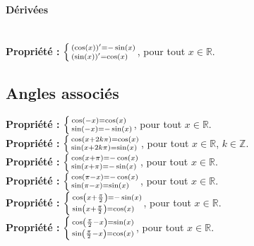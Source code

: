 \documentclass[a4paper,titlepage]{article}
\let\oldleft\left
\renewcommand{\left}{\mathopen{}\mathclose\bgroup\oldleft}
\let\oldright\right
\renewcommand{\right}{\aftergroup\egroup\oldright}
\begin{document}
            \paragraph{Dérivées}\mbox{}\\
                \textbf{Propriété :} $\left\{\begin{smallmatrix*}[l]\left(\cos\left(x\right)\right)^{\prime}=-\sin\left(x\right)\\\left(\sin\left(x\right)\right)^{\prime}=\cos\left(x\right)\end{smallmatrix*}\!\right.$, pour tout $x\in\mathbb{R}$.
    \subsection{Angles associés}
        \textbf{Propriété :} $\left\{\begin{smallmatrix*}[l]\cos\left(-x\right)=\cos\left(x\right)\\\sin\left(-x\right)=-\sin\left(x\right)\end{smallmatrix*}\!\right.$, pour tout $x\in\mathbb{R}$.
        \\
        \textbf{Propriété :} $\left\{\begin{smallmatrix*}[l]\cos\left(x+2k\pi\right)=\cos\left(x\right)\\\sin\left(x+2k\pi\right)=\sin\left(x\right)\end{smallmatrix*}\!\right.$, pour tout $x\in\mathbb{R}$, $k\in\mathbb{Z}$.
        \\
        \textbf{Propriété :} $\left\{\begin{smallmatrix*}[l]\cos\left(x+\pi\right)=-\cos\left(x\right)\\\sin\left(x+\pi\right)=-\sin\left(x\right)\end{smallmatrix*}\!\right.$, pour tout $x\in\mathbb{R}$.
        \\
        \textbf{Propriété :} $\left\{\begin{smallmatrix*}[l]\cos\left(\pi-x\right)=-\cos\left(x\right)\\\sin\left(\pi-x\right)=\sin\left(x\right)\end{smallmatrix*}\!\right.$, pour tout $x\in\mathbb{R}$.
        \\
        \textbf{Propriété :} $\left\{\begin{smallmatrix*}[l]\cos\left(x+\frac{\pi}{2}\right)=-\sin\left(x\right)\\\sin\left(x+\frac{\pi}{2}\right)=\cos\left(x\right)\end{smallmatrix*}\!\right.$, pour tout $x\in\mathbb{R}$.
        \\
        \textbf{Propriété :} $\left\{\begin{smallmatrix*}[l]\cos\left(\frac{\pi}{2}-x\right)=\sin\left(x\right)\\\sin\left(\frac{\pi}{2}-x\right)=\cos\left(x\right)\end{smallmatrix*}\!\right.$, pour tout $x\in\mathbb{R}$.
\end{document}

